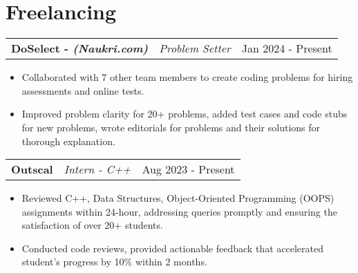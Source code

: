 \documentclass[a4paper,10pt]{article}
\makeatletter
\newenvironment{joblong}[3]
    {
    \begin{tabularx}{\linewidth}{@{}l X r@{}}
    \textbf{#1} & \textit{#2} &  #3 \\[3pt]
    \end{tabularx}
    \begin{minipage}[t]{\linewidth}
    \begin{itemize}[nosep,after=\strut, leftmargin=1em, itemsep=2pt,label=--]
    }
    {
    \end{itemize}
    \end{minipage}    
    }
\makeatother
\begin{document}
\section{Freelancing}
\vspace{-4pt}
\begin{joblong}{DoSelect - {\footnotesize \textit{\textbf{(Naukri.com)}}}}{Problem Setter}{Jan 2024 - Present}
    \item Collaborated with 7 other team members to create coding problems for hiring assessments and online tests.
    \item Improved problem clarity for 20+ problems, added test cases and code stubs for new problems, wrote editorials for
    problems and their solutions for thorough explanation.
\end{joblong}

\begin{joblong}{Outscal}{Intern - C++}{Aug 2023 - Present}
    \item Reviewed C++, Data Structures, Object-Oriented Programming (OOPS) assignments within 24-hour, addressing
    queries promptly and ensuring the satisfaction of over 20+ students.
    \item Conducted code reviews, provided actionable feedback that accelerated student’s progress by 10\% within 2 months.
\end{joblong}
\end{document}
